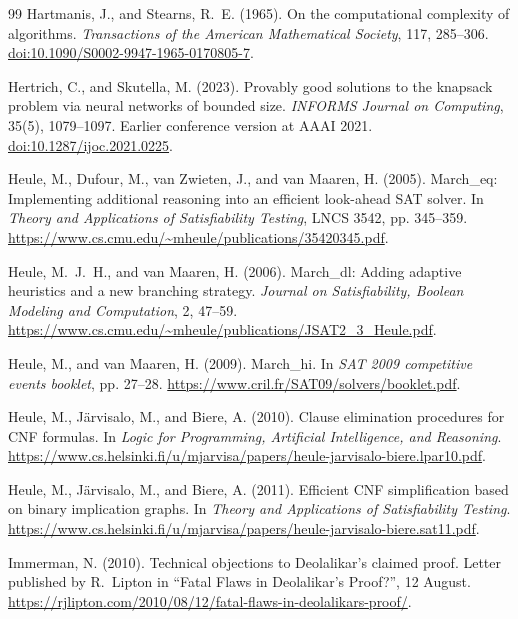 \documentclass[11pt,a4paper]{article}
\numberwithin{equation}{section}
\theoremstyle{plain}
\theoremstyle{definition}
\theoremstyle{remark}
\begin{document}
\begin{thebibliography}{99}
Hartmanis, J., and Stearns, R.~E. (1965).
On the computational complexity of algorithms.
\emph{Transactions of the American Mathematical Society}, 117, 285--306.
\href{https://doi.org/10.1090/S0002-9947-1965-0170805-7}{doi:10.1090/S0002-9947-1965-0170805-7}.

Hertrich, C., and Skutella, M. (2023).
Provably good solutions to the knapsack problem via neural networks of bounded size.
\emph{INFORMS Journal on Computing}, 35(5), 1079--1097.
Earlier conference version at AAAI 2021.
\href{https://doi.org/10.1287/ijoc.2021.0225}{doi:10.1287/ijoc.2021.0225}.

Heule, M., Dufour, M., van Zwieten, J., and van Maaren, H. (2005).
March\_eq: Implementing additional reasoning into an efficient look-ahead SAT solver.
In \emph{Theory and Applications of Satisfiability Testing}, LNCS 3542, pp. 345--359.
\url{https://www.cs.cmu.edu/~mheule/publications/35420345.pdf}.

Heule, M.~J.~H., and van Maaren, H. (2006).
March\_dl: Adding adaptive heuristics and a new branching strategy.
\emph{Journal on Satisfiability, Boolean Modeling and Computation}, 2, 47--59.
\url{https://www.cs.cmu.edu/~mheule/publications/JSAT2_3_Heule.pdf}.

Heule, M., and van Maaren, H. (2009).
March\_hi.
In \emph{SAT 2009 competitive events booklet}, pp. 27--28.
\url{https://www.cril.fr/SAT09/solvers/booklet.pdf}.


Heule, M., J\"arvisalo, M., and Biere, A. (2010).
Clause elimination procedures for CNF formulas.
In \emph{Logic for Programming, Artificial Intelligence, and Reasoning}.
\url{https://www.cs.helsinki.fi/u/mjarvisa/papers/heule-jarvisalo-biere.lpar10.pdf}.

Heule, M., J\"arvisalo, M., and Biere, A. (2011).
Efficient CNF simplification based on binary implication graphs.
In \emph{Theory and Applications of Satisfiability Testing}.
\url{https://www.cs.helsinki.fi/u/mjarvisa/papers/heule-jarvisalo-biere.sat11.pdf}.

Immerman, N. (2010).
Technical objections to Deolalikar's claimed proof.
Letter published by R.~Lipton in ``Fatal Flaws in Deolalikar's Proof?'', 12 August.
\url{https://rjlipton.com/2010/08/12/fatal-flaws-in-deolalikars-proof/}.


\end{thebibliography}
\end{document}

